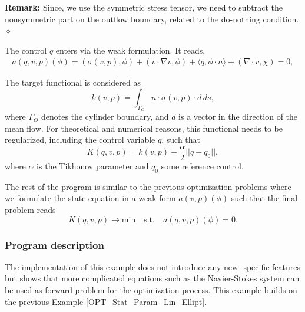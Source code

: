 \textbf{Remark:} Since, we use the 
symmetric stress tensor, we need to subtract the nonsymmetric part 
on the outflow boundary, related to the do-nothing condition.
$\diamond$

The control $q$ enters via the weak formulation. It reads,
\begin{align*}
a(q,v,p)(\phi) = (\sigma(v,p), \phi) + (v\cdot \nabla v, \phi) 
+ \langle q, \phi\cdot n \rangle + (\nabla\cdot v, \chi) = 0,
\end{align*}




The target functional is considered as 
\[
k(v,p) = \int_{\Gamma_O} n\cdot \sigma(v,p)\cdot d \, ds,
\]
where $\Gamma_O$ denotes the cylinder boundary, and $d$ is a vector in the
direction
of the mean flow. For theoretical and numerical reasons, this functional 
needs to be regularized, including the control variable $q$, such that
\[
K(q,v,p) = k(v,p) + \frac{\alpha}{2}||q - q_0||,
\] 
where $\alpha$ is the Tikhonov parameter and $q_0$ some 
reference control. 

The rest of the program is similar to the previous optimization problems where
we formulate the state equation in a weak form $a(v,p)(\phi)$ such that the 
final problem reads
\[
K(q,v,p) \rightarrow \text{min} \quad \text{s.t.} \quad a(q,v,p)(\phi) = 0.
\]


\subsubsection{Program description}
The implementation of this example does not introduce any new \dope{}-specific
features but shows that more complicated equations such as the Navier-Stokes 
system can be used as forward problem for the optimization process. 
This example builds on the previous Example \ref{OPT_Stat_Param_Lin_Ellipt}.

